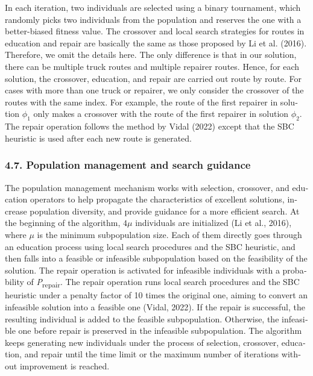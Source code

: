 \documentclass[
  english,
]{article}
\begin{document}
\begin{otherlanguage}{english}
\protect{}\label{p0580}
In each iteration, two individuals are selected using a binary tournament, which randomly picks two
individuals from the population and reserves the one with a better-biased fitness value. The
crossover and local search strategies for routes in education and repair are basically the same as
those proposed by Li et al. (2016). Therefore, we omit the details here. The only difference is that
in our solution, there can be multiple truck routes and multiple repairer routes. Hence, for each
solution, the crossover, education, and repair are carried out route by route. For cases with more
than one truck or repairer, we only consider the crossover of the routes with the same index. For
example, the route of the first repairer in solution \(\phi_{1}\) only makes a crossover with the
route of the first repairer in solution \(\phi_{2}\). The repair operation follows the method by
Vidal (2022) except that the SBC heuristic is used after each new route is generated.

\protect{}\label{s0100}
\subsubsection{4.7. Population management and search guidance}\label{st120}

\protect{}\label{p0585}
The population management mechanism works with selection, crossover, and education operators to help
propagate the characteristics of excellent solutions, increase population diversity, and provide
guidance for a more efficient search. At the beginning of the algorithm, \(4\mu\) individuals are
initialized (Li et al., 2016), where \(\mu\) is the minimum subpopulation size. Each of them
directly goes through an education process using local search procedures and the SBC heuristic, and
then falls into a feasible or infeasible subpopulation based on the feasibility of the solution. The
repair operation is activated for infeasible individuals with a probability of
\emph{P}\textsubscript{repair}. The repair operation runs local search procedures and the SBC
heuristic under a penalty factor of 10 times the original one, aiming to convert an infeasible
solution into a feasible one (Vidal, 2022). If the repair is successful, the resulting individual is
added to the feasible subpopulation. Otherwise, the infeasible one before repair is preserved in the
infeasible subpopulation. The algorithm keeps generating new individuals under the process of
selection, crossover, education, and repair until the time limit or the maximum number of iterations
without improvement is reached.


\end{otherlanguage}
\end{document}
